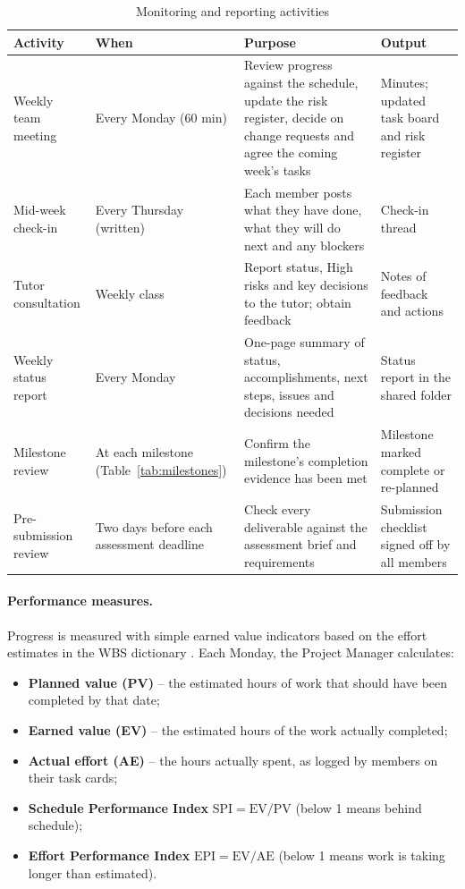 \begin{table}[htbp]
\centering
\caption{Monitoring and reporting activities}
\label{tab:reporting}
\begin{tabularx}{\textwidth}{@{}>{\raggedright\arraybackslash}p{} >{\raggedright\arraybackslash}p{} >{\raggedright\arraybackslash}X >{\raggedright\arraybackslash}p{}@{}}
  \toprule
  \textbf{Activity} & \textbf{When} & \textbf{Purpose} & \textbf{Output} \\
  \midrule
  Weekly team meeting & Every Monday (60 min) & Review progress against the schedule, update the risk register, decide on change requests and agree the coming week's tasks & Minutes; updated task board and risk register \\
  \addlinespace
  Mid-week check-in & Every Thursday (written) & Each member posts what they have done, what they will do next and any blockers & Check-in thread \\
  \addlinespace
  Tutor consultation & Weekly class & Report status, High risks and key decisions to the tutor; obtain feedback & Notes of feedback and actions \\
  \addlinespace
  Weekly status report & Every Monday & One-page summary of status, accomplishments, next steps, issues and decisions needed & Status report in the shared folder \\
  \addlinespace
  Milestone review & At each milestone (Table~\ref{tab:milestones}) & Confirm the milestone's completion evidence has been met & Milestone marked complete or re-planned \\
  \addlinespace
  Pre-submission review & Two days before each assessment deadline & Check every deliverable against the assessment brief and requirements & Submission checklist signed off by all members \\
  \bottomrule
\end{tabularx}
\end{table}

\paragraph{Performance measures.} Progress is measured with simple earned value indicators based on the effort estimates in the WBS dictionary \parencite{pmi2021pmbok}. Each Monday, the Project Manager calculates:

\begin{itemize}[nosep]
  \item \textbf{Planned value (PV)} -- the estimated hours of work that should have been completed by that date;
  \item \textbf{Earned value (EV)} -- the estimated hours of the work actually completed;
  \item \textbf{Actual effort (AE)} -- the hours actually spent, as logged by members on their task cards;
  \item \textbf{Schedule Performance Index} $\text{SPI} = \text{EV} / \text{PV}$ (below 1 means behind schedule);
  \item \textbf{Effort Performance Index} $\text{EPI} = \text{EV} / \text{AE}$ (below 1 means work is taking longer than estimated).
\end{itemize}

